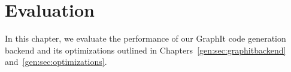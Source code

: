 \chapter{Evaluation}\label{sec:eval}

In this chapter, we evaluate the performance of our GraphIt code generation backend and its optimizations outlined in Chapters~\ref{gen:sec:graphitbackend} and~\ref{gen:sec:optimizations}.




